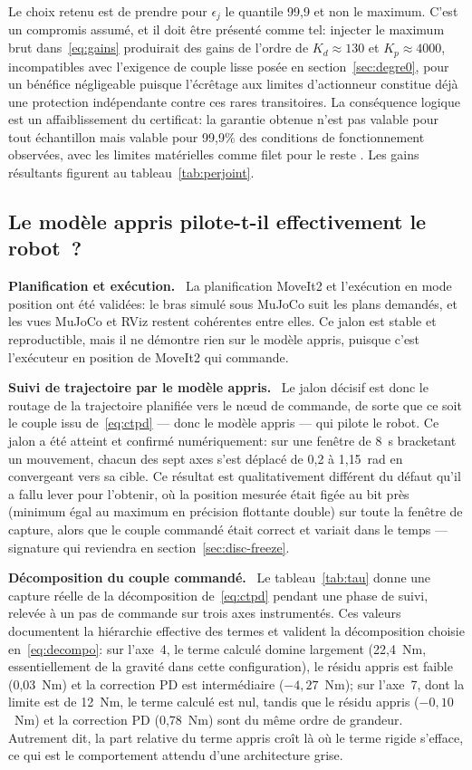 \documentclass[a4paper, oneside]{article}
\newcommand{\parag}[1]{%
    \par\medskip\noindent\textbf{#1}\ \ignorespaces%
}
\begin{document}
Le choix retenu est de prendre pour $\epsilon_j$ le quantile 99{,}9 et non le
maximum. C'est un compromis assumé, et il doit être présenté comme tel:
injecter le maximum brut dans~\eqref{eq:gains} produirait des gains de l'ordre
de $K_d \approx 130$ et $K_p \approx 4000$, incompatibles avec l'exigence de
couple lisse posée en section~\ref{sec:degre0}, pour un bénéfice négligeable
puisque l'écrêtage aux limites d'actionneur constitue déjà une protection
indépendante contre ces rares transitoires. La conséquence logique est un
affaiblissement du certificat: la garantie obtenue n'est pas \og valable pour
tout échantillon \fg{} mais \og valable pour 99{,}9\% des conditions de
fonctionnement observées, avec les limites matérielles comme filet pour le
reste \fg{}. Les gains résultants figurent au tableau~\ref{tab:perjoint}.

\subsection{Le modèle appris pilote-t-il effectivement le robot~?}
\label{sec:res-loop}

\parag{Planification et exécution.} La planification MoveIt2 et l'exécution en
mode position ont été validées: le bras simulé sous MuJoCo suit les plans
demandés, et les vues MuJoCo et RViz restent cohérentes entre elles. Ce jalon
est stable et reproductible, mais il ne démontre rien sur le modèle appris,
puisque c'est l'exécuteur en position de MoveIt2 qui commande.

\parag{Suivi de trajectoire par le modèle appris.} Le jalon décisif est donc le
routage de la trajectoire planifiée vers le n\oe ud de commande, de sorte que ce
soit le couple issu de~\eqref{eq:ctpd} — donc le modèle appris — qui pilote le
robot. Ce jalon a été atteint et confirmé numériquement: sur une fenêtre de
8~s bracketant un mouvement, chacun des sept axes s'est déplacé de 0{,}2 à
1{,}15~rad en convergeant vers sa cible. Ce résultat est qualitativement
différent du défaut qu'il a fallu lever pour l'obtenir, où la position mesurée
était figée au bit près (minimum égal au maximum en précision flottante double)
sur toute la fenêtre de capture, alors que le couple commandé était correct et
variait dans le temps — signature qui reviendra en
section~\ref{sec:disc-freeze}.

\parag{Décomposition du couple commandé.} Le tableau~\ref{tab:tau} donne une
capture réelle de la décomposition de~\eqref{eq:ctpd} pendant une phase de
suivi, relevée à un pas de commande sur trois axes instrumentés. Ces valeurs
documentent la hiérarchie effective des termes et valident la décomposition
choisie en~\eqref{eq:decompo}: sur l'axe~4, le terme calculé domine largement
(22{,}4~Nm, essentiellement de la gravité dans cette configuration), le résidu
appris est faible (0{,}03~Nm) et la correction PD est intermédiaire
($-4{,}27$~Nm); sur l'axe~7, dont la limite est de 12~Nm, le terme calculé est
nul, tandis que le résidu appris ($-0{,}10$~Nm) et la correction PD (0{,}78~Nm)
sont du même ordre de grandeur. Autrement dit, la part relative du terme appris
croît là où le terme rigide s'efface, ce qui est le comportement attendu d'une
architecture grise.
\end{document}
